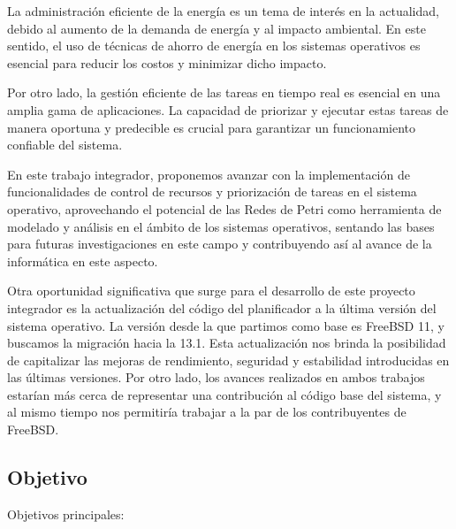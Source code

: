 La administración eficiente de la energía es un tema de interés en la actualidad, debido al aumento de la demanda de energía y al impacto ambiental. En este sentido, el uso de técnicas de ahorro de energía en los sistemas operativos es esencial para reducir los costos y minimizar dicho impacto.\par

Por otro lado, la gestión eficiente de las tareas en tiempo real es esencial en una amplia gama de aplicaciones. La capacidad de priorizar y ejecutar estas tareas de manera oportuna y predecible es crucial para garantizar un funcionamiento confiable del sistema.\par

En este trabajo integrador, proponemos avanzar con la implementación de funcionalidades de control de recursos y priorización de tareas en el sistema operativo, aprovechando el potencial de las Redes de Petri como herramienta de modelado y análisis en el ámbito de los sistemas operativos, sentando las bases para futuras investigaciones en este campo y contribuyendo así al avance de la informática en este aspecto.\par

Otra oportunidad significativa que surge para el desarrollo de este proyecto integrador es la actualización del código del planificador a la última versión del sistema operativo. La versión desde la que partimos como base es FreeBSD 11, y buscamos la migración hacia la 13.1. Esta actualización nos brinda la posibilidad de capitalizar las mejoras de rendimiento, seguridad y estabilidad introducidas en las últimas versiones. Por otro lado, los avances realizados en ambos trabajos estarían más cerca de representar una contribución al código base del sistema, y al mismo tiempo nos permitiría trabajar a la par de los contribuyentes de FreeBSD.\par

\subsection{Objetivo}

Objetivos principales:

